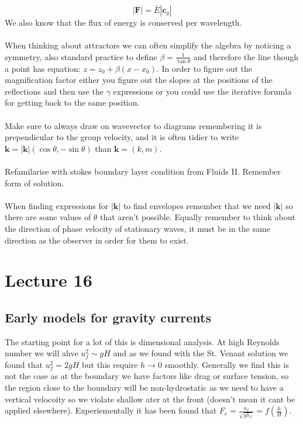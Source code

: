 \documentclass{article}
\begin{document}
           $$
            | \bm F| = \bar E |\bm c_g|
           $$
           We also know that the flux of energy is conserved per wavelength. \\\\
           When thinking about attractors we can often simplify the algebra by noticing a symmetry, also standard practice to define $\beta = \frac{1}{\tan \theta}$ and therefore the line though a point has equation: $z= z_0 + \beta (x- x_0)$. In order to figure out the magnification factor either you figure out the slopes at the positions of the reflections and then use the $\gamma$ expressions or you could use the iterative forumla for getting back to the same position.\\\\
           Make sure to always draw on wavevector to diagrams remembering it is prependicular to the group velocity, and it is often tidier to write $\bm k = |\bm k| (\cos \theta, - \sin \theta)$ than $\bm k = (k,m)$.\\\\
           Refamilarise with stokes boundary layer condition from Fluids II. Remember form of solution.\\\\
           When finding expressions for $|\bm k|$ to find envelopes remember that we need $|\bm k|$ so there are some values of $\theta$ that aren't possible. Equally remember to think about the direction of phase velocity of stationary waves, it must be in the same direction as the observer in order for them to exist.
           \section{Lecture 16}
           \subsection{Early models for gravity currents}
           The starting point for a lot of this is dimensional analysis. At high Reynolds number we will ahve $u_f^2 \sim gH$ and as we found with the St. Venant solution we found that $u_f^2 = 2 gH$ but this require $h \rightarrow 0$ smoothly. Generally we find this is not the case as at the boundary we have factors like drag or surface tension, so the region close to the boundary will be non-hydrostatic as we need to have a vertical velocoity so we violate shallow ater at the front (doesn't mean it cant be applied elsewhere). Experiementally it has been found that $F_r = \frac{u_f}{\sqrt{g h_f}} = f(\frac{h}{H})$.
\end{document}
